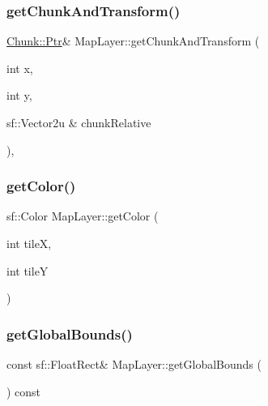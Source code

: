 \mbox{\label{classMapLayer_a5686d500c087caa0c096c965d5d36574}} 
\subsubsection{\texorpdfstring{get\+Chunk\+And\+Transform()}{getChunkAndTransform()}}
{\footnotesize\ttfamily \hyperlink{classMapLayer_1_1Chunk_ab1df4d3621c5d9f83c2edb46d0744078}{Chunk\+::\+Ptr}\& Map\+Layer\+::get\+Chunk\+And\+Transform (\begin{DoxyParamCaption}\item[{int}]{x,  }\item[{int}]{y,  }\item[{sf\+::\+Vector2u \&}]{chunk\+Relative }\end{DoxyParamCaption})\hspace{0.3cm}{\ttfamily [inline]}, {\ttfamily [private]}}

\mbox{\label{classMapLayer_a6ecfbaf968ac9e6e4f814a30aa0c0f30}} 
\subsubsection{\texorpdfstring{get\+Color()}{getColor()}}
{\footnotesize\ttfamily sf\+::\+Color Map\+Layer\+::get\+Color (\begin{DoxyParamCaption}\item[{int}]{tileX,  }\item[{int}]{tileY }\end{DoxyParamCaption})\hspace{0.3cm}{\ttfamily [inline]}}

\mbox{\label{classMapLayer_ae87bc38c7c030e9b2822b53f6de13d13}} 
\subsubsection{\texorpdfstring{get\+Global\+Bounds()}{getGlobalBounds()}}
{\footnotesize\ttfamily const sf\+::\+Float\+Rect\& Map\+Layer\+::get\+Global\+Bounds (\begin{DoxyParamCaption}{ }\end{DoxyParamCaption}) const\hspace{0.3cm}{\ttfamily [inline]}}

